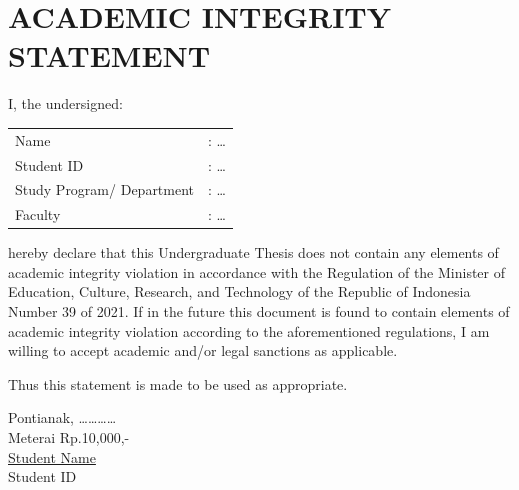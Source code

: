 \chapter*{ACADEMIC INTEGRITY STATEMENT}
\thispagestyle{empty}
\noindent I, the undersigned: \\
\begin{tabular}{@{}ll}
Name & : \dots \\
Student ID & : \dots \\
Study Program/ Department & : \dots \\
Faculty & : \dots \\
\end{tabular}

\vspace{0.5cm}
\noindent hereby declare that this Undergraduate Thesis does not contain any elements of academic integrity violation in accordance with the Regulation of the Minister of Education, Culture, Research, and Technology of the Republic of Indonesia Number 39 of 2021. If in the future this document is found to contain elements of academic integrity violation according to the aforementioned regulations, I am willing to accept academic and/or legal sanctions as applicable.

\vspace{0.5cm}
\noindent Thus this statement is made to be used as appropriate.

\vspace{1cm}
\begin{flushright}
\begin{minipage}{5cm}
\begin{singlespace}
Pontianak, \dots\dots\dots\dots \\[1.5cm]
Meterai Rp.10,000,- \\
\underline{Student Name} \\
Student ID
\end{singlespace}
\end{minipage}
\end{flushright}
